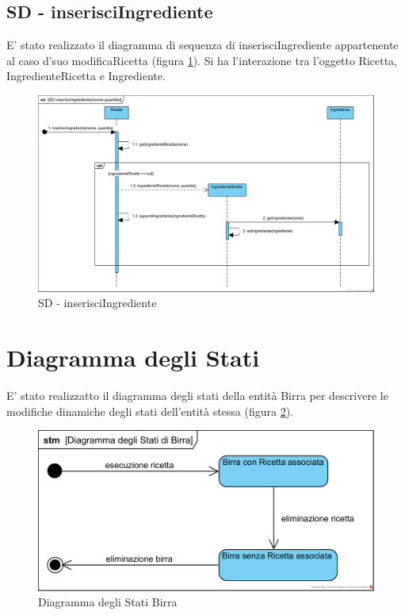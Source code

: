 \documentclass[a4paper,12pt]{report}
\begin{document}
		\subsection{SD - inserisciIngrediente}
			E' stato realizzato il diagramma di sequenza di inserisciIngrediente appartenente al caso d'suo modificaRicetta (figura \ref{fig:SD-inserisciIngrediente}).
Si ha l'interazione tra l'oggetto Ricetta, IngredienteRicetta e Ingrediente.
			\begin{figure}[!h]
				\centering
				\includegraphics[width=01\linewidth]{image/SD-inserisciIngrediente.png}
				\caption{SD - inserisciIngrediente}\label{fig:SD-inserisciIngrediente}
			\end{figure}

         \section{Diagramma degli Stati}
         E' stato realizzatto il diagramma degli stati della entità Birra per descrivere le modifiche dinamiche degli stati dell'entità stessa (figura \ref{fig:stati-birra}).
		\begin{figure}[!h]
			\centering
			\includegraphics[width=0.8\linewidth]{image/Diagramma-degli-Stati-Birra.png}
			\caption{Diagramma degli Stati Birra}\label{fig:stati-birra}
		\end{figure}    			
\end{document}
